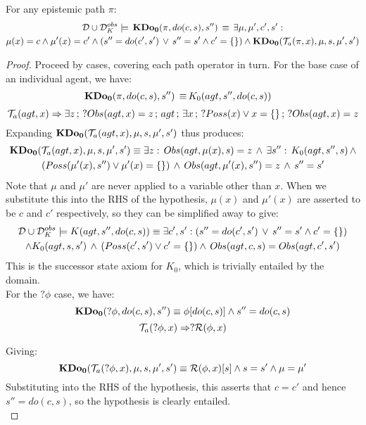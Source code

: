 \begin{lemma}
\label{lem:TrnA_works}For any epistemic path $\pi$:\begin{multline*}
\mathcal{D}\cup\mathcal{D}_{K}^{obs}\models\,\mathbf{KDo_{0}}(\pi,do(c,s),s'')\,\equiv\,\exists\mu,\mu',c',s':\\
\mu(x)=c\wedge\mu'(x)=c'\wedge\left(s''=do(c',s')\,\vee\, s''=s'\wedge c'=\{\}\right)\wedge\mathbf{KDo_{0}}(\mathcal{T}_{a}(\pi,x),\mu,s,\mu',s')\end{multline*}

\end{lemma}
\begin{proof}
Proceed by cases, covering each path operator in turn. For the base
case of an individual agent, we have:\begin{align*}
\mathbf{KDo_{0}}(\pi,do(c,s),s'')\,\equiv\, & K_{0}(agt,s'',do(c,s))\end{align*}
 \[
\mathcal{T}_{a}(agt,x)\Rightarrow\exists z\,;\,?Obs(agt,x)=z\,;\, agt\,;\,\exists x\,;\,?Poss(x)\vee x=\{\}\,;\,?Obs(agt,x)=z\]
 Expanding $\mathbf{KDo_{0}}(\mathcal{T}_{a}(agt,x),\mu,s,\mu',s')$ thus produces:\begin{multline*}
\mathbf{KDo_{0}}(\mathcal{T}_{a}(agt,x),\mu,s,\mu',s')\equiv\exists z:\, Obs(agt,\mu(x),s)=z\,\wedge\,\exists s'':\, K_{0}(agt,s'',s)\,\wedge\\
\left(Poss(\mu'(x),s'')\vee\mu'(x)=\{\}\right)\,\wedge\, Obs(agt,\mu'(x),s'')=z\,\wedge\, s''=s'\end{multline*}
 Note that $\mu$ and $\mu'$ are never applied to a variable other
than $x$. When we substitute this into the RHS of the hypothesis,
$\mu(x)$ and $\mu'(x)$ are asserted to be $c$ and $c'$ respectively,
so they can be simplified away to give:\begin{multline*}
\mathcal{D}\cup\mathcal{D}_{K}^{obs}\models K(agt,s'',do(c,s))\equiv\exists c',s':\left(s''=do(c',s')\,\vee\, s''=s'\wedge c'=\{\}\right)\\
\wedge K_{0}(agt,s,s')\,\wedge\,\left(Poss(c',s')\vee c'=\{\}\right)\wedge\, Obs(agt,c,s)=Obs(agt,c',s')\end{multline*}
 This is the successor state axiom for $K_{0}$, which is trivially
entailed by the domain.\\


For the $?\phi$ case, we have:\[
\mathbf{KDo_{0}}(?\phi,do(c,s),s'')\equiv\phi[do(c,s)]\wedge s''=do(c,s)\]
 \[
\mathcal{T}_{a}(?\phi,x)\Rightarrow?\mathcal{R}(\phi,x)\]


Giving:\[
\mathbf{KDo_{0}}(\mathcal{T}_{a}(?\phi,x),\mu,s,\mu',s')\equiv\mathcal{R}(\phi,x)[s]\wedge s=s'\wedge\mu=\mu'\]
 Substituting into the RHS of the hypothesis, this asserts that $c=c'$
and hence $s''=do(c,s)$, so the hypothesis is clearly entailed.\\



\end{proof}
